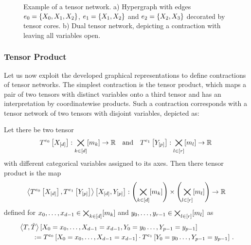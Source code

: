 \begin{figure}
	\begin{center}
		
	\end{center}
	\caption{
	Example of a tensor network.
	a) Hypergraph with edges $e_0=\{X_{0},X_{1},X_{2}\}$, $e_1=\{X_{1},X_{2}\}$ and $e_2=\{X_{2},X_{3}\}$ decorated by tensor cores.
	b) Dual tensor network, depicting a contraction with leaving all variables open.
	}\label{fig:network}
\end{figure}





\subsubsection{Tensor Product}

Let us now exploit the developed graphical representations to define contractions of tensor networks.
The simplest contraction is the tensor product, which maps a pair of two tensors with distinct variables onto a third tensor and has an interpretation by coordinatewise products.
Such a contraction corresponds with a tensor network of two tensors with disjoint variables, depicted as:
\begin{center}
	
\end{center}

\begin{definition}\label{def:tensorProduct}
	Let there be two tensor
	\begin{align*}
		T^{e_0}\left[X_{[d]}\right] : \bigtimes_{k\in[d]}[m_{k}] \rightarrow \mathbb{R} \quad \text{and} \quad  T^{e_1}\left[Y_{[p]}\right] : \bigtimes_{l\in[r]}[m_{l}] \rightarrow \mathbb{R} \, 
	\end{align*}
	with different categorical variables assigned to its axes.
	Then there tensor product is the map
	\begin{align*}
		\left\langle T^{e_0}\left[X_{[d]}\right],T^{e_1}\left[Y_{[p]}\right]\right\rangle \left[ X_{[d]},Y_{[p]} \right] :  \left(\bigtimes_{k\in[d]}[m_{k}]\right) \times \left(\bigtimes_{l\in[r]}[m_{l}]\right) \rightarrow \mathbb{R}
	\end{align*}
	defined for $x_{0},\ldots,x_{d-1}\in\bigtimes_{k\in[d]}[m_{k}]$ and ${y_{0},\ldots,y_{r-1}}\in\bigtimes_{l\in[r]}[m_{l}]$ as
	\begin{align*}
		& \left\langle T,\tilde{T}\right\rangle \left[ X_{0}=x_{0},\ldots,X_{d-1}=x_{d-1},Y_{0}=y_{0}\ldots,Y_{p-1}=y_{p-1} \right] \\
		&\quad\quad :=  T^{e_0}\left[X_{0}=x_{0},\ldots,X_{d-1}=x_{d-1}\right]\cdot T^{e_1}\left[Y_{0}=y_{0}\ldots,Y_{p-1}=y_{p-1}\right] \, .
	\end{align*}
\end{definition}

